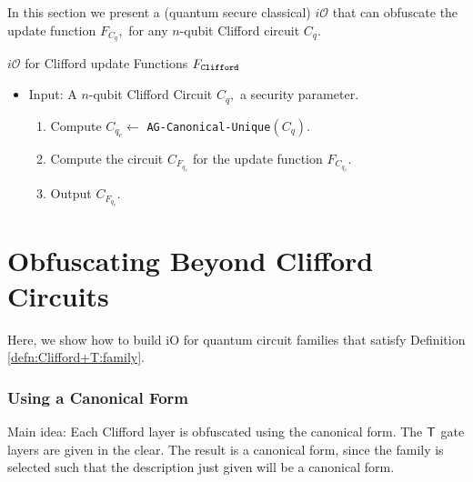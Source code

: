 In this section we present a (quantum secure classical) $i\mathcal{O}$ that can obfuscate the update function $F_{C_q},$ for any $n$-qubit Clifford circuit $C_q.$

\begin{algorithm}[H]
   \caption{$i\mathcal{O}$ for Clifford update Functions $F_{\tt Clifford}$}
  \begin{itemize}
  \item Input: A $n$-qubit Clifford Circuit $C_q,$ a security parameter.
  \begin{enumerate}
  \item Compute $C_{q_c}\leftarrow$ {\tt AG-Canonical-Unique}$(C_q).$
  \item Compute the circuit $C_{F_{q_c}}$ for the update function $F_{C_{q_c}}.$
  \item Output $C_{F_{q_c}}.$
  \end{enumerate}
  \end{itemize}
\end{algorithm}

\section{Obfuscating Beyond Clifford Circuits}
Here, we show how to build iO for quantum circuit families that satisfy Definition \ref{defn:Clifford+T:family}.

\subsubsection{Using a Canonical Form}
Main idea: Each Clifford layer is obfuscated using the canonical form. The ${\sf T}$ gate layers are given in the clear. The result is a canonical form, since the family is selected such that the description just given will be a canonical form.


